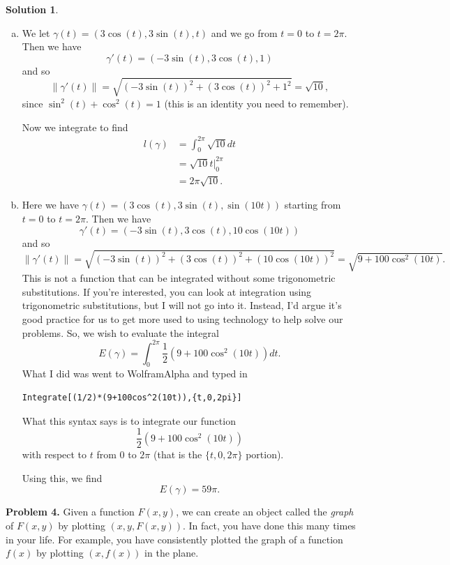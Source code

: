 \documentclass[12pt]{report} %
\theoremstyle{definition}
\newtheorem{solution}{Solution}
\begin{document}
\begin{solution}~
\begin{enumerate}[(a)]
    \item We let $\gamma(t) = (3\cos (t), 3\sin(t), t)$ and we go from $t=0$ to $t=2\pi$. Then we have
\[
\gamma'(t) = (-3\sin(t),3\cos(t),1)
\]
and so
\[
\|\gamma'(t)\| = \sqrt{(-3\sin (t))^2+(3\cos (t))^2+1^2} = \sqrt{10},
\]
since $\sin^2(t)+\cos^2(t)=1$ (this is an identity you need to remember).

Now we integrate to find
\begin{align*}
    l(\gamma) &= \int_0^{2\pi} \sqrt{10}dt\\
    &= \sqrt{10} t|_0^{2\pi}\\
    &= 2\pi \sqrt{10}.
\end{align*}
    \item Here we have $\gamma(t)=(3\cos(t),3\sin(t),\sin(10t))$ starting from $t=0$ to $t=2\pi$. Then we have
    \[
    \gamma'(t)=(-3\sin(t),3\cos(t),10\cos(10t))
    \]
    and so
    \[
    \|\gamma'(t)\| = \sqrt{(-3\sin(t))^2+(3\cos(t))^2+(10\cos(10t))^2} = \sqrt{9+100\cos^2(10t)}.
    \]
    This is not a function that can be integrated without some trigonometric substitutions.  If you're interested, you can look at integration using trigonometric substitutions, but I will not go into it.  
    Instead, I'd argue it's good practice for us to get more used to using technology to help solve our problems.  So, we wish to evaluate the integral
    \[
    E(\gamma) = \int_0^{2\pi} \frac{1}{2}(9+100\cos^2(10t))dt.
    \]
    What I did was went to WolframAlpha and typed in
    \begin{center}
    \begin{lstlisting}
Integrate[(1/2)*(9+100cos^2(10t)),{t,0,2pi}]
\end{lstlisting}
    \end{center}
    What this syntax says is to integrate our function 
    \[
    \frac{1}{2}(9+100\cos^2(10t))
    \]
    with respect to $t$ from $0$ to $2\pi$ (that is the $\{t,0,2\pi\}$ portion).
    
    Using this, we find
    \[
    E(\gamma)=59\pi.
    \]

\end{enumerate}
\end{solution}

\noindent\textbf{Problem 4.} Given a function $F(x,y)$, we can create an object called the \emph{graph} of $F(x,y)$ by plotting $(x,y,F(x,y))$.  In fact, you have done this many times in your life.  For example, you have consistently plotted the graph of a function $f(x)$ by plotting $(x,f(x))$ in the plane.  
\end{document}
